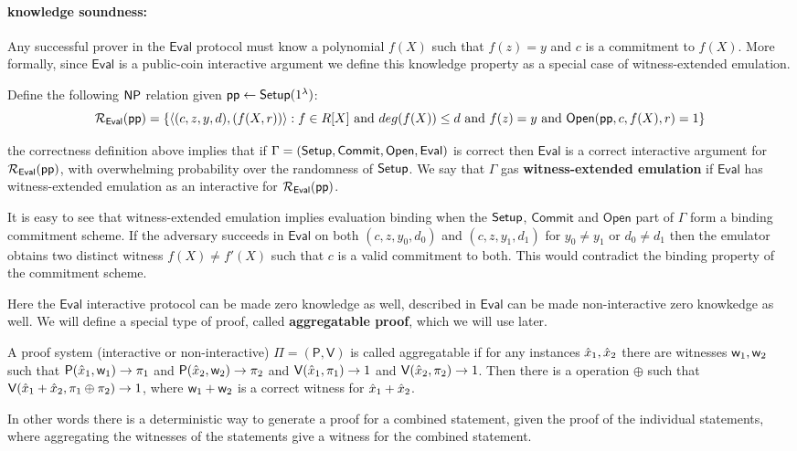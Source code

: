 \documentclass[runningheads]{llncs}
\def\commit{\mathsf{Commit}}
\def\open{\mathsf{Open}}
\def\eval{\mathsf{Eval}}
\def\pp{\mathsf{pp}}
\def\prover{\mathsf{P}}
\def\verifier{\mathsf{V}}
\begin{document}
\paragraph{\textbf{knowledge soundness: }} Any successful prover in the $\eval$ protocol must know a polynomial $f(X)$ such that $f(z)=y$ and $c$ is a commitment to $f(X)$. More formally, since $\eval$ is a public-coin interactive argument we define this knowledge property as a special case of witness-extended emulation.

Define the following $\mathsf{NP}$ relation given $\pp\leftarrow \setup(\secparam)$:
$$\calR_{\eval}(\pp)=\{\innp{(c,z,y,d)}{(f(X,r))}: f\in R[X] \text{ and } deg(f(X))\leq d
\text{ and } f(z)=y \text{ and }\open(\pp,c,f(X),r) =1 \}$$
 
the correctness definition above implies that if $\Gamma = (\setup, \commit, \open, \eval)$ is correct then $\eval$ is a correct interactive argument for $\calR_{\eval}(\pp)$, with overwhelming probability over the randomness of $\mathsf{Setup}$. We say that $\Gamma$ gas \textbf{witness-extended emulation} if $\eval$ has witness-extended emulation as an interactive for $\calR_{\eval}(\pp)$.

It is easy to see that witness-extended emulation implies evaluation binding when the $\mathsf{Setup}$, $\commit$ and $\open$ part of $\Gamma$ form a binding commitment scheme. If the adversary succeeds in $\eval$ on both $(c,z, y_0,d_0)$ and $(c,z,y_1,d_1)$ for $y_0\neq y_1$ or $d_0\neq d_1$ then the emulator obtains two distinct witness $f(X)\neq f'(X)$ such that $c$ is a valid commitment to both. This would contradict the binding property of the commitment scheme.

Here the $\eval$ interactive protocol can be made zero knowledge as well, described in \cite{DARK19}
$\eval$ can be made non-interactive zero knowkedge as well.
We will define a special type of proof, called \textbf{aggregatable proof}, which we will use later.

\begin{definition}\label{defn:aggregatable}
	A proof system (interactive or non-interactive) $\Pi=(\prover, \verifier)$ is called aggregatable if for any instances $\hat{x}_1, \hat{x}_2$ there are witnesses $\mathsf{w}_1, \mathsf{w}_2$ such that $\prover(\stmt_1,\wit_1) \rightarrow \pi_1$ and $\prover(\stmt_2, \wit_2) \rightarrow \pi_2$ and $\verifier(\stmt_1,\pi_1) \rightarrow 1$ and $\verifier(\stmt_2,\pi_2) \rightarrow 1$. Then there is a operation $\oplus$ such that $\verifier(\stmt_1+\stmt_2, \pi_1 \oplus \pi_2) \rightarrow 1$, where $\mathsf{w}_1 + \mathsf{w}_2$ is a correct witness for $\hat{x}_1+\hat{x}_2$.
\end{definition}
In other words there is a deterministic way to generate a proof for a combined statement, given the proof of the individual statements, where aggregating the witnesses of the statements give a witness for the combined statement.
\end{document}
